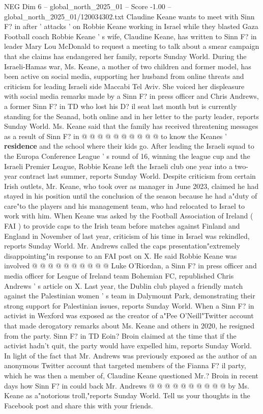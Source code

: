 \begin{textsample}{NEG Dim 6 – global\_north\_2025\_01 – Score -1.00 – global\_north\_2025\_01/120034302.txt}  \label{ex:f6_neg_181}
Claudine Keane wants to meet with Sinn F? in after ' attacks ' on Robbie Keane working in Israel while they blasted Gaza Football coach Robbie Keane ' s wife, Claudine Keane, has written to Sinn F? in leader Mary Lou McDonald to request a meeting to talk about a smear campaign that she claims has endangered her family, reports Sunday World.
During the Israeli-Hamas war, Ms.
Keane, a mother of two children and former model, has been active on social media, supporting her husband from online threats and criticism for leading Israeli side Maccabi Tel Aviv.
She voiced her displeasure with social media remarks made by a Sinn F? in press officer and Chris Andrews, a former Sinn F? in TD who lost his D? il seat last month but is currently standing for the Seanad, both online and in her letter to the party leader, reports Sunday World.
Ms.
Keane said that the family has received threatening messages as a result of Sinn F? in @ @ @ @ @ @ @ @ @ @ to know the Keanes ' \textbf{residence} and the school where their kids go.
After leading the Israeli squad to the Europa Conference League ' s round of 16, winning the league cup and the Israeli Premier League, Robbie Keane left the Israeli club one year into a two-year contract last summer, reports Sunday World.
Despite criticism from certain Irish outlets, Mr.
Keane, who took over as manager in June 2023, claimed he had stayed in his position until the conclusion of the season because he had a"duty of care"to the players and his management team, who had relocated to Israel to work with him.
When Keane was asked by the Football Association of Ireland ( FAI ) to provide caps to the Irish team before matches against Finland and England in November of last year, criticism of his time in Israel was rekindled, reports Sunday World.
Mr.
Andrews called the caps presentation"extremely disappointing"in response to an FAI post on X.
He said Robbie Keane was involved @ @ @ @ @ @ @ @ @ @ Luke O'Riordan, a Sinn F? in press officer and media officer for League of Ireland team Bohemian FC, republished Chris Andrews ' s article on X.
Last year, the Dublin club played a friendly match against the Palestinian women ' s team in Dalymount Park, demonstrating their strong support for Palestinian issues, reports Sunday World.
When a Sinn F? in activist in Wexford was exposed as the creator of a"Pee O'Neill"Twitter account that made derogatory remarks about Ms.
Keane and others in 2020, he resigned from the party.
Sinn F? in TD Eoin?
Broin claimed at the time that if the activist hadn't quit, the party would have expelled him, reports Sunday World.
In light of the fact that Mr.
Andrews was previously exposed as the author of an anonymous Twitter account that targeted members of the Fianna F? il party, which he was then a member of, Claudine Keane questioned Mr.?
Broin in recent days how Sinn F? in could back Mr.
Andrews @ @ @ @ @ @ @ @ @ @ by Ms.
Keane as a"notorious troll,"reports Sunday World.
Tell us your thoughts in the Facebook post and share this with your friends.

\end{textsample}
